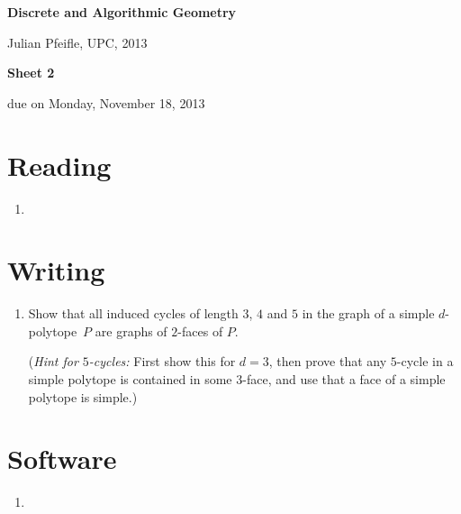 \documentclass[11pt]{amsart}
\begin{document}
\begin{center}
\textbf{\sffamily
   Discrete and Algorithmic Geometry }

\medskip
   Julian Pfeifle,
   UPC, 2013 \mbox{}
\end{center}

\bigskip

\begin{center}
  \textbf{\sffamily Sheet 2}

\bigskip
 due on Monday, November 18, 2013

\end{center}

\bigskip
\bigskip
\bigskip

\section*{Reading}

\begin{enumerate}
\setlength{\itemsep}{2ex}

\item
\end{enumerate}

\bigskip
\bigskip
\section*{Writing}

\begin{enumerate}
\item Show that all induced cycles of length $3$, $4$ and $5$ in the graph of a simple
$d$-polytope~$P$ are graphs of $2$-faces of $P$. 

(\emph{Hint for $5$-cycles:} First show this for $d=3$, then prove
that any $5$-cycle in a simple polytope is contained in some $3$-face,
and use that a face of a simple polytope is simple.)
\end{enumerate}

\bigskip
\bigskip
\section*{Software}

\begin{enumerate}
\setlength{\itemsep}{2ex}
\item
\end{enumerate}
\end{document}
